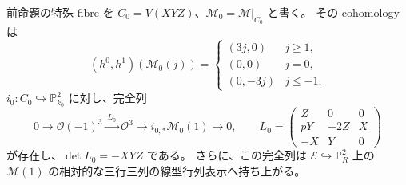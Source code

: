 \begin{lemma}[境界の点線束の線型行列表示]
\label{lem:nfm-hesse-boundary-determinantal-line}
前命題の特殊 fibre を $C_0=V(XYZ)$、$\mathcal M_0=\mathcal M|_{C_0}$ と書く。
その cohomology は
\[
 (h^0,h^1)(\mathcal M_0(j))=
 \begin{cases}
 (3j,0)&j\ge1,\\
 (0,0)&j=0,\\
 (0,-3j)&j\le-1.
 \end{cases}
\]
$i_0:C_0\hookrightarrow\mathbb P^2_{k_0}$ に対し、完全列
\begin{equation}
 \label{eq:nfm-hesse-boundary-determinantal-line}
 0\longrightarrow\mathcal O(-1)^3
 \xrightarrow{\ L_0\ }\mathcal O^3
 \longrightarrow i_{0,*}\mathcal M_0(1)\longrightarrow0,
 \qquad
 L_0=\begin{pmatrix}Z&0&0\\pY&-2Z&X\\-X&Y&0\end{pmatrix}
\end{equation}
が存在し、$\det L_0=-XYZ$ である。
さらに、この完全列は $\mathcal E\hookrightarrow\mathbb P^2_R$ 上の
$\mathcal M(1)$ の相対的な三行三列の線型行列表示へ持ち上がる。
\end{lemma}
